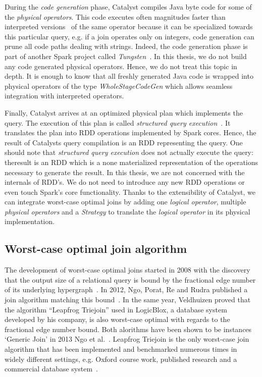 During the \textit{code generation} phase, Catalyst compiles Java byte code for some of the \textit{physical
operators}.
This code executes often magnitudes faster than interpreted versions~\cite{catalyst} of the same operator because
it can be specialized towards this particular query, e.g. if a join operates only on integers, code
generation can prune all code paths dealing with strings.
Indeed, the code generation phase is part of another Spark project called \textit{Tungsten}~\cite{tungsten}.
In this thesis, we do not build any code generated physical operators.
Hence, we do not treat this topic in depth.
It is enough to know that all freshly generated Java code is wrapped into physical operators of the type \textit{WholeStageCodeGen}
which allows seamless integration with interpreted operators.

Finally, Catalyst arrives at an optimized physical plan which implements the query.
The execution of this plan is called
\textit{structured query execution}~\cite{spark-internals-structured-query-execution}.
It translates the plan into RDD operations implemented by Spark cores.
Hence, the result of Catalysts query compilation is an RDD representing the query.
One should note that \textit{structured query execution} does not actually execute the query: theresult is an RDD which is a none materialized representation of the operations necessary to generate the
result.
In this thesis, we are not concerned with the internals of RDD's.
We do not need to introduce any new RDD operations or even touch Spark's core functionality.
Thanks to the extensibility of Catalyst, we can integrate worst-case optimal joins by adding one \textit{logical operator}, multiple
\textit{physical operators} and a \textit{Strategy} to translate the \textit{logical operator} in
its physical implementation.

\subsection{Worst-case optimal join algorithm}
The development of worst-case optimal joins started in 2008 with the discovery that the output size of a relational query is bound by the fractional edge number of its underlying hypergraph~\cite{agm}.
In 2012, Ngo, Porat, Re and Rudra published a join algorithm matching this bound~\cite{nprr}.
In the same year, Veldhuizen proved that the algorithm ``Leapfrog Triejoin'' used in LogicBlox, a database system developed by his company, is also worst-case optimal with regards to the
fractional edge number bound.
Both alorithms have been shown to be instances `Generic Join' in 2013 Ngo et al.~\cite{skew-strikes-back}.
Leapfrog Triejoin is the only worst-case join algorithm that has been implemented and benchmarked numerous times in widely different settings, e.g. Oxford course work, published research and a commercial database system~\cite{leapfrog,andreas,olddog,myria,ammar2018distributed,leapfrog-triejoin-schroeder}.

